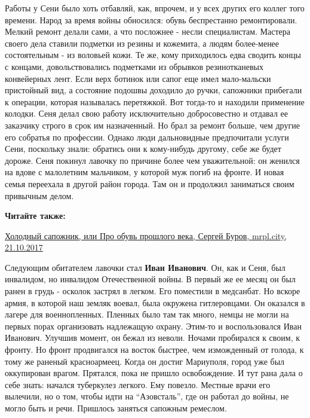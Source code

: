 Работы у Сени было хоть отбавляй, как, впрочем, и у всех других его коллег того
времени. Народ за время войны обносился: обувь беспрестанно ремонтировали.
Мелкий ремонт делали сами, а что посложнее - несли специалистам. Мастера своего
дела ставили подметки из резины и кожемита, а людям более-менее состоятельным -
из воловьей кожи. Те же, кому приходилось едва сводить концы с концами,
довольствовались подметками из обрывков резинотканевых конвейерных лент. Если
верх ботинок или сапог еще имел мало-мальски пристойный вид, а состояние
подошвы доходило до ручки, сапожники прибегали к операции, которая называлась
перетяжкой. Вот тогда-то и находили применение колодки. Сеня делал свою работу
исключительно добросовестно и отдавал ее заказчику строго в срок им
назначенный. Но брал за ремонт больше, чем другие его собратья по профессии.
Однако люди дальновидные предпочитали услуги Сени, поскольку знали: обратись
они к кому-нибудь другому, себе же будет дороже. Сеня покинул лавочку по
причине более чем уважительной: он женился на вдове с малолетним мальчиком, у
которой муж погиб на фронте. И новая семья переехала в другой район города. Там
он и продолжил заниматься своим привычным делом.

\textbf{Читайте также:} 

\href{https://mrpl.city/blogs/view/holodnyj-sapozhnik-ili-pro-obuv-proshlogo-veka}{%
Холодный сапожник, или Про обувь прошлого века, Сергей Буров, mrpl.city, 21.10.2017}

Следующим обитателем лавочки стал \textbf{Иван Иванович}. Он, как и Сеня, был инвалидом,
но инвалидом Отечественной войны. В первый же ее месяц он был ранен в грудь -
осколок застрял в легком. Его поместили в медсанбат. Но вскоре армия, в которой
наш земляк воевал, была окружена гитлеровцами. Он оказался в лагере для
военнопленных. Пленных было там так много, немцы не могли на первых порах
организовать надлежащую охрану. Этим-то и воспользовался Иван Иванович. Улучшив
момент, он бежал из неволи. Ночами пробирался к своим, к фронту. Но фронт
продвигался на восток быстрее, чем изможденный от голода, к тому же раненый
красноармеец. Когда он достиг Мариуполя, город уже был оккупирован врагом.
Прятался, пока не пришло освобождение. И тут рана дала о себе знать: начался
туберкулез легкого. Ему повезло. Местные врачи его вылечили, но о том, чтобы
идти на \enquote{Азовсталь}, где он работал до войны, не могло быть и речи. Пришлось
заняться сапожным ремеслом.

